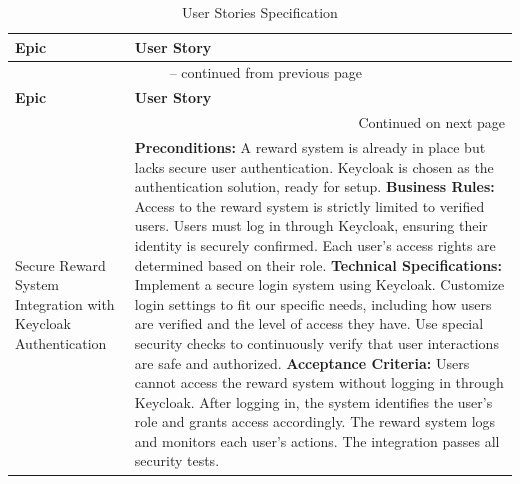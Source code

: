 \begin{longtable}{|m{3cm}|m{12cm}|}
\caption{User Stories Specification} \label{tab:user_stories_specification} \\
\hline
\textbf{Epic} & \textbf{User Story} \\
\hline
\endfirsthead
\multicolumn{2}{c}{{\tablename\ \thetable{} -- continued from previous page}} \\
\hline
\textbf{Epic} & \textbf{User Story} \\
\hline
\endhead
\hline
\multicolumn{2}{r}{{Continued on next page}} \\
\endfoot
\hline
\endlastfoot

Secure Reward System Integration with Keycloak Authentication &
\textbf{Preconditions:} \newline A reward system is already in place but lacks secure user authentication. Keycloak is chosen as the authentication solution, ready for setup. \newline
\textbf{Business Rules:} \newline Access to the reward system is strictly limited to verified users. Users must log in through Keycloak, ensuring their identity is securely confirmed. Each user's access rights are determined based on their role. \newline
\textbf{Technical Specifications:} \newline Implement a secure login system using Keycloak. Customize login settings to fit our specific needs, including how users are verified and the level of access they have. Use special security checks to continuously verify that user interactions are safe and authorized. \newline
\textbf{Acceptance Criteria:} \newline Users cannot access the reward system without logging in through Keycloak. After logging in, the system identifies the user's role and grants access accordingly. The reward system logs and monitors each user's actions. The integration passes all security tests. \\
\hline


\end{longtable}
